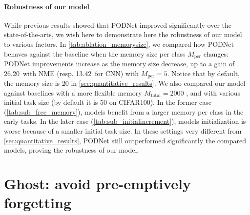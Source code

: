 \label{sec:robustness}
\paragraph{Robustness of our model} While previous results showed that PODNet improved significantly
over the state-of-the-arts, we wish here to demonstrate here the robustness of our model to various
factors. In \autoref{tab:ablation_memorysize}, we compared how PODNet behaves against the baseline
when the memory size per class $M_{\text{per}}$ changes: PODNet improvements increase as the memory
size decrease, up to a gain of 26.20\pp\ with NME (resp. 13.42\pp\ for CNN) with $M_{\text{per}} =
    5$. Notice that by default, the memory size is 20 in \autoref{sec:quantitative_results}.
We also compared our model against baselines with a more flexible memory $M_{\text{total}} = 2000$
\citep{rebuffi2017icarl,wu2019bias_correction}, and with various initial task size (by default it is
50 on CIFAR100). In the former case (\autoref{tab:sub_free_memory}), models benefit from a larger
memory per class in the early tasks. In the later case (\autoref{tab:sub_initialincrement}), models
initialization is worse because of a smaller initial task size. In these settings very different
from \autoref{sec:quantitative_results}, PODNet still outperformed significantly the compared
models, proving the robustness of our model.





\section{Ghost: avoid pre-emptively forgetting}
\label{sec:ghost}

